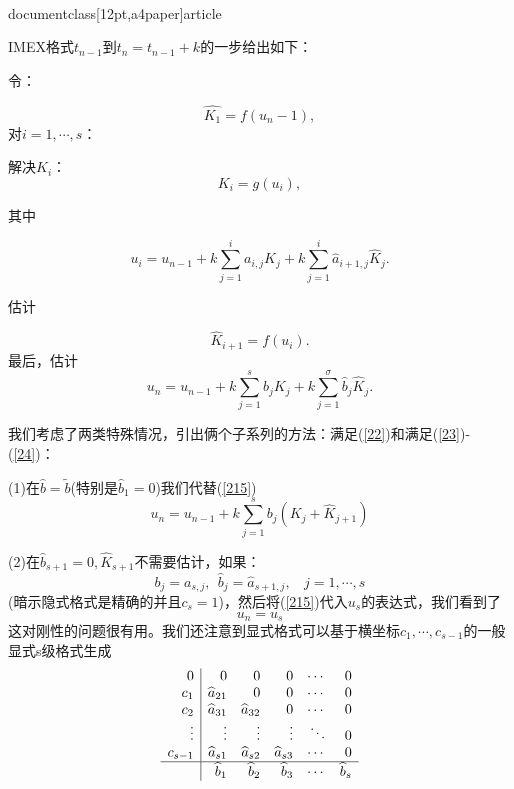 \\documentclass[12pt,a4paper]{article}
\begin{document}
IMEX格式$t_{n-1}$到$t_{n}=t_{n-1}+k$的一步给出如下：

令：

\begin{equation}
\widehat{K_{1}}=f(u_{n}-1),
\label{211}
\end{equation}
对$i=1,\cdots,s$：

\textbullet 解决$K_{i}$：
\begin{equation}
K_{i}=g(u_{i}),
\label{212}
\end{equation}

其中

\begin{equation}
u_{i}=u_{n-1}+k\sum_{j=1}^{i}a_{i,j}K_{j}+k\sum_{j=1}^{i}\widehat{a}_{i+1,j}\widehat{K}_{j}.
\label{213}
\end{equation}

\textbullet 估计

\begin{equation}
\widehat{K}_{i+1}=f(u_{i}).
\label{214}
\end{equation}
最后，估计
\begin{equation}
u_{n}=u_{n-1}+k\sum_{j=1}^{s}b_{j}K_{j}+k\sum_{j=1}^{\sigma}\widehat{b}_{j}\widehat{K}_{j}.
\label{215}
\end{equation}

我们考虑了两类特殊情况，引出俩个子系列的方法：满足(\ref{22})和满足(\ref{23})-(\ref{24})：

(1)在$\widehat{b}=\tilde{b}$(特别是$\widehat{b}_{1}=0$)我们代替(\ref{215})
\begin{equation}
u_{n}=u_{n-1}+k\sum_{j=1}^{s}b_{j}(K_{j}+\widehat{K}_{j+1})
\label{22}
\end{equation}

(2)在$\widehat{b}_{s+1}=0,\widehat{K}_{s+1}$不需要估计，如果：
\begin{equation}
b_{j}=a_{s,j},~~\widehat{b}_{j}=\widehat{a}_{s+1,j},~~~~j=1,\cdots,s
\label{23}
\end{equation}
(暗示隐式格式是精确的并且$c_{s}=1$)，然后将(\ref{215})代入$u_{s}$的表达式，我们看到了
\begin{equation}
u_{n}=u_{s}
\label{24}
\end{equation}
这对刚性的问题很有用。我们还注意到显式格式可以基于横坐标$c_{1},\cdots,c_{s-1}$的一般显式s级格式生成
\[
\begin{array}{r|r r r r r}
0 & 0 & 0 & 0 & \cdots & 0\\
c_{1}  & \widehat{a}_{21} & 0 & 0 & \cdots & 0\\
c_{2}  & \widehat{a}_{31} & \widehat{a}_{32} & 0 & \cdots & 0\\\
\vdots & \vdots & \vdots & \vdots & \ddots & 0\\
c_{s-1}  & \widehat{a}_{s1} & \widehat{a}_{s2} & \widehat{a}_{s3} & \cdots & 0\\
\hline
& \widehat{b}_{1} & \widehat{b}_{2} & \widehat{b}_{3} & \cdots & \widehat{b}_{s}
\end{array}
\]
\end{document}
